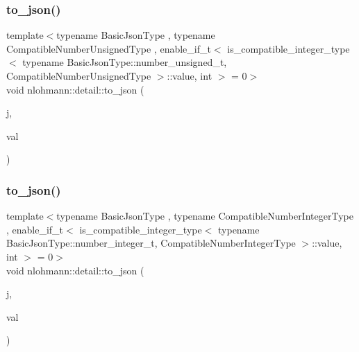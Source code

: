 \subsubsection{\texorpdfstring{to\_json()}{to\_json()}\hspace{0.1cm}{\footnotesize\ttfamily [4/8]}}
{\footnotesize\ttfamily template$<$typename Basic\+Json\+Type , typename Compatible\+Number\+Unsigned\+Type , enable\+\_\+if\+\_\+t$<$ is\+\_\+compatible\+\_\+integer\+\_\+type$<$ typename Basic\+Json\+Type\+::number\+\_\+unsigned\+\_\+t, Compatible\+Number\+Unsigned\+Type $>$\+::value, int $>$  = 0$>$ \\
void nlohmann\+::detail\+::to\+\_\+json (\begin{DoxyParamCaption}\item[{Basic\+Json\+Type \&}]{j,  }\item[{Compatible\+Number\+Unsigned\+Type}]{val }\end{DoxyParamCaption})\hspace{0.3cm}{\ttfamily [noexcept]}}

\mbox{\label{namespacenlohmann_1_1detail_a91fe576be579c8c2fdd14610605c6dd2}} 
\subsubsection{\texorpdfstring{to\_json()}{to\_json()}\hspace{0.1cm}{\footnotesize\ttfamily [5/8]}}
{\footnotesize\ttfamily template$<$typename Basic\+Json\+Type , typename Compatible\+Number\+Integer\+Type , enable\+\_\+if\+\_\+t$<$ is\+\_\+compatible\+\_\+integer\+\_\+type$<$ typename Basic\+Json\+Type\+::number\+\_\+integer\+\_\+t, Compatible\+Number\+Integer\+Type $>$\+::value, int $>$  = 0$>$ \\
void nlohmann\+::detail\+::to\+\_\+json (\begin{DoxyParamCaption}\item[{Basic\+Json\+Type \&}]{j,  }\item[{Compatible\+Number\+Integer\+Type}]{val }\end{DoxyParamCaption})\hspace{0.3cm}{\ttfamily [noexcept]}}

\mbox{\label{namespacenlohmann_1_1detail_a1f83504de38ee6f440a77ae898b86a18}} 
